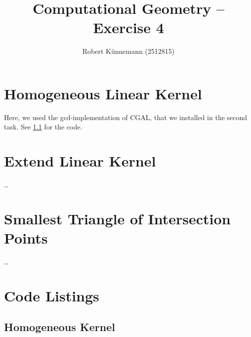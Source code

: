 \documentclass[a4paper]{scrartcl}
\title{Computational Geometry -- Exercise 4}
\author{Robert K\"unnemann (2512815)}
\begin{document}
\maketitle

\section*{Homogeneous Linear Kernel}

Here, we used the gcd-implementation of CGAL, that we installed in the second task. See \ref{homo_kernel} for the code.

\section*{Extend Linear Kernel }
\dots

\section*{Smallest Triangle of Intersection Points}
\dots


\appendix
\section{Code Listings}
\subsection{Homogeneous Kernel}
\label{homo_kernel}

\end{document}
